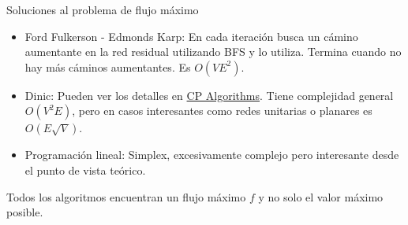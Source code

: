 \documentclass{beamer}
\begin{document}
\begin{frame}{Soluciones al problema de flujo máximo}
    \begin{itemize}
        \item Ford Fulkerson - Edmonds Karp: En cada iteración busca un cámino aumentante en la red residual utilizando BFS y lo utiliza. Termina cuando no hay más cáminos aumentantes. Es $O(VE^2)$.
        \item Dinic: Pueden ver los detalles en \href{https://cp-algorithms.com/graph/dinic.html}{CP Algorithms}. Tiene complejidad general $O(V^2E)$, pero en casos interesantes como redes unitarias o planares es $O(E\sqrt{V})$.
        \item Programación lineal: Simplex, excesivamente complejo pero interesante desde el punto de vista teórico.
    \end{itemize}

    Todos los algoritmos encuentran un flujo máximo $f$ y no solo el valor máximo posible.
\end{frame}
\end{document}
